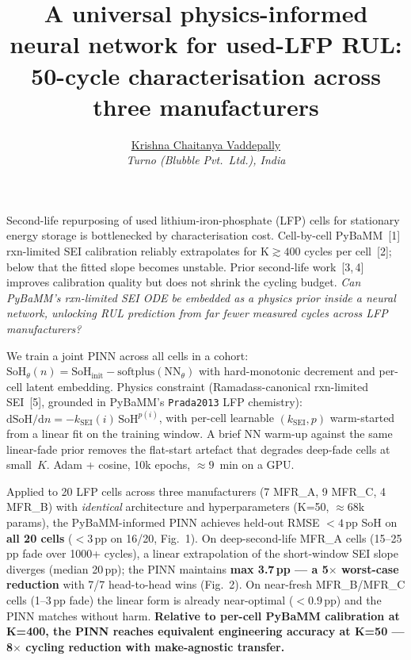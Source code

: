 \documentclass[12pt,a4paper]{article}
\title{\vspace{-1.0cm}\textbf{\normalsize A universal physics-informed neural
network for used-LFP RUL:\\ 50-cycle characterisation across three manufacturers}}
\author{\normalsize \underline{Krishna Chaitanya Vaddepally}\\[-0.3em]
  \small \emph{Turno (Blubble Pvt.\ Ltd.), India}}
\date{}
\begin{document}
\maketitle
\thispagestyle{empty}

\vspace{-3.6em}
Second-life repurposing of used lithium-iron-phosphate (LFP) cells for
stationary energy storage is bottlenecked by characterisation cost.
Cell-by-cell PyBaMM~[1] rxn-limited SEI calibration reliably
extrapolates for K${\gtrsim}400$ cycles per cell~[2]; below that the
fitted slope becomes unstable. Prior second-life work~[3,\,4] improves
calibration quality but does not shrink the cycling budget. \emph{Can
PyBaMM's rxn-limited SEI ODE be embedded as a physics prior inside a
neural network, unlocking RUL prediction from far fewer measured
cycles across LFP manufacturers?}

We train a joint PINN across all cells in a cohort:
$\text{SoH}_\theta(n) = \text{SoH}_\text{init} -
\text{softplus}(\text{NN}_\theta)$ with hard-monotonic decrement and
per-cell latent embedding. Physics constraint (Ramadass-canonical
rxn-limited SEI~[5], grounded in PyBaMM's \texttt{Prada2013} LFP
chemistry): $\text{d}\text{SoH}/\text{d}n =
-k_\text{SEI}(i)\,\text{SoH}^{p(i)}$, with per-cell learnable
$(k_\text{SEI}, p)$ warm-started from a linear fit on the training
window. A brief NN warm-up against the same linear-fade prior removes
the flat-start artefact that degrades deep-fade cells at small~$K$.
Adam + cosine, 10k epochs, ${\approx}9$~min on a GPU.

Applied to 20 LFP cells across three manufacturers (7 MFR\_A, 9
MFR\_C, 4 MFR\_B) with \emph{identical} architecture and
hyperparameters (K=50, ${\approx}68$k params), the PyBaMM-informed
PINN achieves held-out RMSE $<4$\,pp SoH on \textbf{all 20 cells}
($<3$\,pp on 16/20, Fig.~1). On deep-second-life MFR\_A cells
(15--25\,pp fade over 1000+ cycles), a linear extrapolation of the
short-window SEI slope diverges (median 20\,pp); the PINN maintains
\textbf{max 3.7\,pp — a 5$\times$ worst-case reduction} with 7/7
head-to-head wins (Fig.~2). On near-fresh MFR\_B/MFR\_C cells
(1--3\,pp fade) the linear form is already near-optimal
($<0.9$\,pp) and the PINN matches without harm.
\textbf{Relative to per-cell PyBaMM calibration at K=400, the PINN
reaches equivalent engineering accuracy at K=50 — 8$\times$ cycling
reduction with make-agnostic transfer.}
\end{document}
